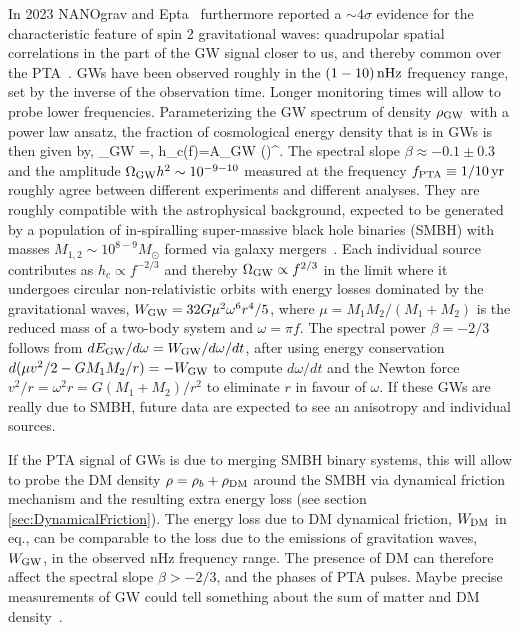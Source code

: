 In 2023 {\sc NANOgrav} and  {\sc Epta}~\cite{PTA} furthermore reported a $\sim 4\sigma$ evidence for the
characteristic feature of spin 2 gravitational waves:
quadrupolar spatial correlations in the part of the GW signal closer to us, 
and thereby common over the PTA~\cite{HD:gravity:wave}.
GWs have been observed roughly in the  $(1-10)\,{\rm nHz}$ frequency range,
set by the inverse of the observation time.
Longer monitoring times will allow to probe lower frequencies.
Parameterizing the GW spectrum of density $\rho_{\rm GW}$ with a power law ansatz, the fraction of cosmological energy density that is in GWs is then given by, 
\beq 
\Omega_{\rm GW} \equiv {} =,\qquad{}\quad
h_c(f)=A_{\rm GW} \left(\right)^\beta.\eeq
The spectral slope $\beta \approx -0.1\pm 0.3$ 
and the amplitude $\Omega_{\rm GW}h^2\sim 10^{-9-10}$ measured at the frequency $f_{\rm PTA}\equiv 1/10\,{\rm yr}$
roughly agree between different experiments and different analyses.
They are roughly compatible with
the astrophysical background, expected to be generated by a population of in-spiralling super-massive black hole binaries (SMBH)
with masses $M_{1,2}\sim 10^{8-9}M_\odot$ formed via galaxy mergers~\cite{PTA:SMBH}.
Each individual source contributes as $h_c\propto f^{-2/3}$ and thereby $\Omega_{\rm GW}\propto f^{2/3}$
in the limit where it undergoes circular non-relativistic orbits
with energy losses dominated by the gravitational waves,
$W_{\rm GW}=32 G \mu^2 \omega^6 r^4/5$, where $\mu=M_1 M_2/(M_1+M_2)$ is the reduced mass of a two-body system and $\omega = \pi f$.
The spectral power $\beta=-2/3$ follows from 
$dE_{\rm GW}/d\omega=W_{\rm GW}/d\omega/dt$,
after using energy conservation $d(\mu v^2/2 - G M_1 M_2/r) = - W_{\rm GW}$
to compute $d\omega/dt$ and the Newton force  $v^2/r=\omega^2r =G(M_1+M_2)/r^2$
to eliminate $r$ in favour of $\omega$.
If these GWs are really due to SMBH, future data are expected to see an anisotropy and individual sources.


If the PTA signal of GWs is due to merging SMBH binary systems, this will allow to probe the DM density $\rho = \rho_b + \rho_{\rm DM}$ 
around the SMBH via dynamical friction mechanism and the resulting extra energy loss (see section \ref{sec:DynamicalFriction}). 
The energy loss due to DM dynamical friction, $W_{\rm DM}$ in eq.,
can be comparable to the loss due to the emissions of gravitation waves, $W_{\rm GW}$, in the observed nHz frequency range. The presence of DM can therefore affect the spectral slope $\beta>-2/3$, and the phases of PTA pulses.
Maybe precise measurements of GW could tell something about the sum of matter and DM density~\cite{PTA:SMBH}. 


